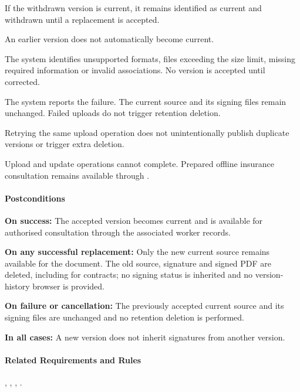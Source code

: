 \begin{description}
    If the withdrawn version is current, it remains identified
    as current and withdrawn until a replacement is accepted.

    An earlier version does not automatically become current.

    \item[A8 --- Validation fails.]
    The system identifies unsupported formats,
    files exceeding the size limit,
    missing required information
    or invalid associations.
    No version is accepted until corrected.

    \item[A9 --- Upload or storage fails.]
    The system reports the failure.
    The current source and its signing files remain unchanged.
    Failed uploads do not trigger retention deletion.

    \item[A10 --- A submission is repeated.]
    Retrying the same upload operation
    does not unintentionally publish
    duplicate versions or trigger extra deletion.

    \item[A11 --- Connectivity is unavailable.]
    Upload and update operations cannot complete.
    Prepared offline insurance consultation
    remains available through .

\end{description}

\paragraph{Postconditions}

\textbf{On success:}
The accepted version becomes current
and is available for authorised consultation
through the associated worker records.


\textbf{On any successful replacement:}
Only the new current source remains available for the document. The old source,
signature and signed PDF are deleted, including for contracts; no signing status
is inherited and no version-history browser is provided.

\textbf{On failure or cancellation:}
The previously accepted current source and its signing files are unchanged
and no retention deletion is performed.

\textbf{In all cases:}
A new version does not inherit signatures
from another version.

\paragraph{Related Requirements and Rules}
\hyperref[fr:040]{}, \hyperref[fr:041]{}, \hyperref[fr:044]{}, \hyperref[fr:063]{}.

